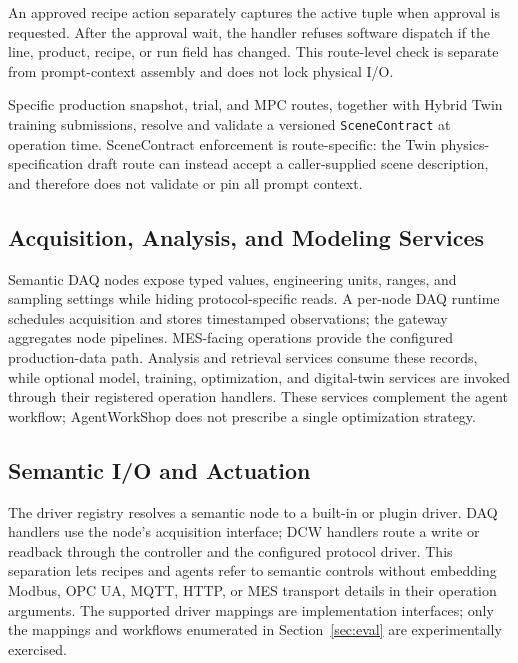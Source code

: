 An approved recipe action separately captures the active tuple when approval
is requested. After the approval wait, the handler refuses software dispatch
if the line, product, recipe, or run field has changed. This route-level check
is separate from prompt-context assembly and does not lock physical I/O.

Specific production snapshot, trial, and MPC routes, together with Hybrid Twin
training submissions, resolve and validate a versioned \texttt{SceneContract}
at operation time. SceneContract enforcement is route-specific: the Twin
physics-specification draft route can instead accept a caller-supplied scene
description, and therefore does not validate or pin all prompt context.

\subsection{Acquisition, Analysis, and Modeling Services}
Semantic DAQ nodes expose typed values, engineering units, ranges, and
sampling settings while hiding protocol-specific reads. A per-node DAQ
runtime schedules acquisition and stores timestamped observations; the
gateway aggregates node pipelines. MES-facing operations provide the
configured production-data path. Analysis and retrieval services consume
these records, while optional model, training, optimization, and digital-twin
services are invoked through their registered operation handlers. These
services complement the agent workflow; AgentWorkShop does not prescribe a
single optimization strategy.

\subsection{Semantic I/O and Actuation}
The driver registry resolves a semantic node to a built-in or plugin driver.
DAQ handlers use the node's acquisition interface; DCW handlers route a
write or readback through the controller and the configured protocol driver.
This separation lets recipes and agents refer to semantic controls without
embedding Modbus, OPC UA, MQTT, HTTP, or MES transport details in their
operation arguments. The supported driver mappings are implementation
interfaces; only the mappings and workflows enumerated in Section~\ref{sec:eval}
are experimentally exercised.

